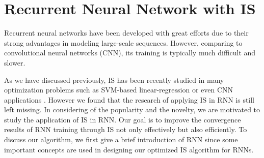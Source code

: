\documentclass[twoside,leqno,twocolumn]{article}
\begin{document}
\section{Recurrent Neural Network with IS}
Recurrent neural networks \cite{funahashi1993approximation, mikolov2010recurrent, pineda1987generalization, wang1993analysis} have been developed with great efforts due to their strong advantages in modeling large-scale sequences. However, comparing to convolutional neural networks (CNN), its training is typically much difficult and slower. 

As we have discussed previously, IS has been recently studied in many optimization problems such as SVM-based linear-regression or even CNN applications \cite{Alain}. However we found that the research of applying IS in RNN is still left missing. In considering of the popularity and the novelty, we are motivated to study the application of IS in RNN. Our goal is to improve the convergence results of RNN training through IS not only effectively but also efficiently. To discuss our algorithm, we first give a brief introduction of RNN since some important concepts are used in designing our optimized IS algorithm for RNNs.
\end{document}
